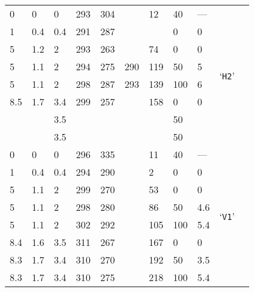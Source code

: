 \begin{longtable}{llll llll lll}
	 \hdashline
	\num{0} & \num{0} &  \num{0} & \num{293} & \num{304} & \num{} & \num{12} & 40 & --- & \multirow{8}{*}{`\texttt{H2}'} \\*
	\num{1} & \num{.4} & \num{.4} & \num{291} & \num{287} & \num{} & \echaf{\num{-.9}} & \num{0} & \num{0} & \\*
	\num{5} & \num{1.2} & \num{2} & \num{293} & \num{263} & \num{} & \num{74} & \num{0} & \num{0} & \\*
	\num{5} & \num{1.1} &  \num{2} & \num{294} & \num{275} & \num{290} & \num{119} & \num{50} & \num{5} & \\*
	\num{5} & \num{1.1} &  \num{2} & \num{298} & \num{287} & \num{293} & \num{139} & \num{100} & \num{6} & \\*
	\num{8.5} & \num{1.7} & \num{3.4} & \num{299} & \num{257} & \num{} & \num{158} & \num{0} & \num{0} & \\*
	\num{} & \num{} &  \num{3.5} & \num{} & \num{} & \num{} & \num{} & \num{50} & \num{} & \\*
	\num{} & \num{} &  \num{3.5} & \num{} & \num{} & \num{} & \num{} & \num{50} & \num{} & \\
	
	 \hdashline
	\num{0} & \num{0} & \num{0} & \num{296} & \num{335} & \num{} & \num{11} & \num{40} & --- & \multirow{8}{*}{`\texttt{V1}'} \\*
	\num{1} & \num{.4} & \num{.4} & \num{294} & \num{290} & \num{} & \num{2} & \num{0} & \num{0} & \\*
	\num{5} & \num{1.1} & \num{2} & \num{299} & \num{270} & \num{} & \num{53} & \num{0} & \num{0} & \\*
	\num{5} & \num{1.1} & \num{2} & \num{298} & \num{280} & \num{} & \num{86} & \num{50} & \num{4.6} & \\*
	\num{5} & \num{1.1} & \num{2} & \num{302} & \num{292} & \num{} & \num{105} & \num{100} & \num{5.4} & \\*
	\num{8.4} & \num{1.6} & \num{3.5} & \num{311} & \num{267} & \num{} & \num{167} & \num{0} & \num{0} & \\*
	\num{8.3} & \num{1.7} & \num{3.4} & \num{310} & \num{270} & \num{} & \num{192} & \num{50} & \num{3.5} & \\*
	\num{8.3} & \num{1.7} & \num{3.4} & \num{310} & \num{275} & \num{} & \num{218} & \num{100} & \num{5.4} & \\
	

\end{longtable}
